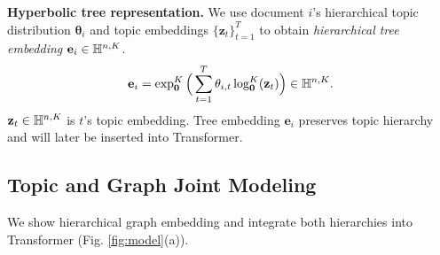 \textbf{Hyperbolic tree representation.} We use document $ i $'s hierarchical topic distribution $ \bm{\theta}_i $ and topic embeddings $ \{\textbf{z}_t\}_{t=1}^T $ to obtain \emph{hierarchical tree embedding} $ \textbf{e}_i\in\Bbb H^{n,K} $.
\begin{equation}
\label{eq:tree_embedding}
    \textbf{e}_i=\exp_{\textbf{0}}^K\Big(\sum_{t=1}^T \theta_{i,t}\log_{\textbf{0}}^K(\textbf{z}_t)\Big)\in\Bbb H^{n,K}.
\end{equation}
$ \textbf{z}_t\in\Bbb H^{n,K} $ is $ t $'s topic embedding. %
Tree embedding $ \textbf{e}_i $ preserves topic hierarchy and will later be inserted into Transformer. %

\subsection{Topic and Graph Joint Modeling}
\label{sec:tranformer}

We show hierarchical graph embedding and integrate both hierarchies into Transformer (Fig. \ref{fig:model}(a)).

